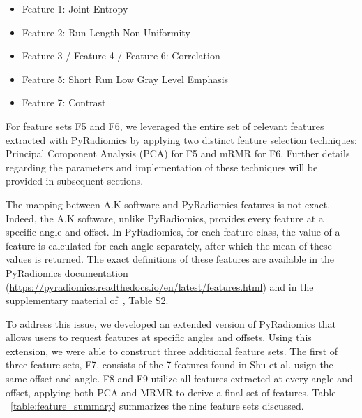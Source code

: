 \begin{itemize}
    \item Feature 1: Joint Entropy
    \item Feature 2: Run Length Non Uniformity
    \item Feature 3 / Feature 4 / Feature 6: Correlation
    \item Feature 5: Short Run Low Gray Level Emphasis
    \item Feature 7: Contrast
\end{itemize}

For feature sets F5 and F6, we leveraged the entire set of relevant features extracted with PyRadiomics by applying two distinct feature selection techniques: Principal Component Analysis (PCA) for F5 and mRMR for F6. Further details regarding the parameters and implementation of these techniques will be provided in subsequent sections.

The mapping between A.K software and PyRadiomics features is not exact. Indeed, the A.K software, unlike PyRadiomics, provides every feature at a specific angle and offset. In PyRadiomics, for each feature class, the value of a feature is calculated for each angle separately, after which the mean of these values is returned. The exact definitions of these features are available in the PyRadiomics documentation (\url{https://pyradiomics.readthedocs.io/en/latest/features.html}) and in the supplementary material of~\cite{shu2021predicting}, Table S2. 

To address this issue, we developed an extended version of PyRadiomics that allows users to request features at specific angles and offsets. Using this extension, we were able to construct three additional feature sets. The first of three feature sets, F7, consists of the 7 features found in Shu et al. usign the same offset and angle. F8 and F9 utilize all features extracted at every angle and offset, applying both PCA and MRMR to derive a final set of features. Table ~\ref{table:feature_summary} summarizes the nine feature sets discussed.

